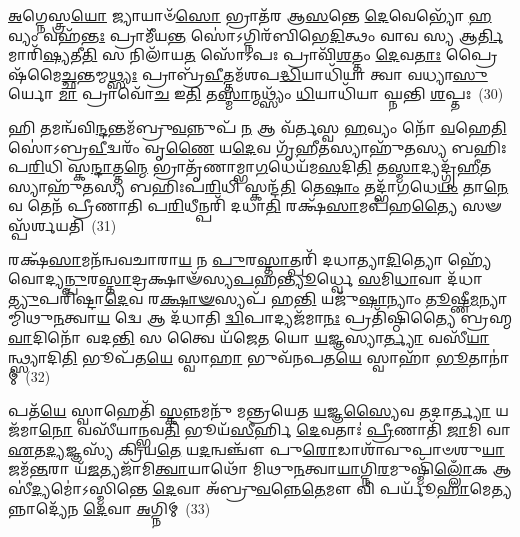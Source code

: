 {\anuvakamend[{\-\ul{𑌆}\-𑌸𑌾\-\ul{𑌦𑍍𑌯} 𑌪𑍍𑌰𑌾𑌨᳴𑌤𑌿𑌦𑍃𑌶𑍍𑌞𑌂 𑌕𑌰𑍋𑌤𑌿 𑌹𑌰𑌤𑌿 𑌵𑌿\-\ul{𑌯𑍁}\-𑌯𑌾𑌦𑍍𑌯𑌜᳴𑌮𑌾𑌨\-\ul{𑌮𑍇}\-𑌵𑌾𑌗𑍍𑌨𑌿𑌰𑌿𑌤𑌿᳴ \ul{𑌸}\-𑌪𑍍𑌤𑌦᳴𑌶 𑌚}]}%

\-\ul{𑌅}\-𑌗𑍍𑌨𑍇𑌸𑍍𑌤𑍍𑌰\-\ul{𑌯𑍋} 𑌜𑍍𑌯𑌾𑌯𑌾𑍞᳴\-\ul{𑌸𑍋} 𑌭𑍍𑌰𑌾𑌤᳴𑌰 𑌆\-\ul{𑌸}\-𑌨𑍍𑌤𑍇 \ul{𑌦𑍇}\-𑌵𑍇𑌭𑍍𑌯𑍋᳴ \ul{𑌹}\-𑌵𑍍𑌯𑌂 𑌵𑌹᳴\-\ul{𑌨𑍍𑌤𑌃} 𑌪𑍍𑌰𑌾𑌮𑍀᳴𑌯\-\ul{𑌨𑍍𑌤} 𑌸𑍋॑\-𑌽𑌗𑍍𑌨𑌿𑌰᳴𑌬𑌿𑌭𑍇\-\ul{𑌦𑌿}\-𑌤𑍍𑌥𑌂 𑌵𑌾𑌵 𑌸𑍍𑌯 𑌆\-\ul{𑌰𑍍𑌤𑌿}\-𑌮𑌾𑌰𑌿᳴\-\ul{𑌷𑍍𑌯}\-𑌤𑍀\-\ul{𑌤𑌿} 𑌸 𑌨𑌿𑌲𑌾᳴𑌯\-\ul{𑌤} 𑌸𑍋᳴\-𑌽𑌪𑌃 𑌪𑍍𑌰𑌾𑌵𑌿᳴\-\ul{𑌶}\-𑌤𑍍𑌤𑌂 \ul{𑌦𑍇}\-𑌵\-\ul{𑌤𑌾𑌃} 𑌪𑍍𑌰𑍈𑌷᳴𑌮𑍈\-\ul{𑌚𑍍𑌛}\-𑌨𑍍𑌤𑌮𑍍𑌮\-\ul{𑌥𑍍𑌸𑍍𑌯𑌃} 𑌪𑍍𑌰𑌾𑌬𑍍𑌰᳴\-\ul{𑌵𑍀}\-𑌤𑍍𑌤𑌮᳴𑌶𑌪\-\ul{𑌦𑍍𑌧𑌿}\-𑌯𑌾𑌧𑌿᳴𑌯𑌾 𑌤𑍍𑌵𑌾 𑌵𑌧𑍍𑌯𑌾\-\ul{𑌸𑍁}\-𑌰𑍍𑌯𑍋 \ul{𑌮𑌾} 𑌪𑍍𑌰𑌾𑌵𑍋᳴\-\ul{𑌚} 𑌇\-\ul{𑌤𑌿} 𑌤\-\ul{𑌸𑍍𑌮𑌾}\-𑌨𑍍𑌮𑌥𑍍𑌸𑍍𑌯𑌂᳴ \ul{𑌧𑌿}\-𑌯𑌾𑌧𑌿᳴𑌯𑌾 𑌘𑍍𑌨𑌨𑍍𑌤𑌿 \ul{𑌶}\-𑌪𑍍𑌤𑌃~(30)

𑌹𑌿 𑌤𑌮𑌨𑍍𑌵᳴𑌵𑌿\-\ul{𑌨𑍍𑌦}\-𑌨𑍍𑌤𑌮᳴𑌬𑍍𑌰𑍁\-\ul{𑌵}\-𑌨𑍍𑌨𑍁𑌪᳴ \ul{𑌨} 𑌆 𑌵᳴𑌰𑍍𑌤𑌸𑍍𑌵 \ul{𑌹}\-𑌵𑍍𑌯𑌂 𑌨𑍋᳴ \ul{𑌵}\-𑌹𑍇\-\ul{𑌤𑌿} 𑌸𑍋॑\-𑌽𑌬𑍍𑌰\-\ul{𑌵𑍀}\-𑌦𑍍𑌵𑌰𑌂᳴ 𑌵𑍃\-\ul{𑌣𑍈} 𑌯\-\ul{𑌦𑍇}\-𑌵 𑌗𑍃᳴\-\ul{𑌹𑍀}\-𑌤𑌸𑍍𑌯𑌾𑌹𑍁᳴𑌤𑌸𑍍𑌯 𑌬𑌹𑌿𑌃𑌪\-\ul{𑌰𑌿}\-𑌧𑌿 𑌸𑍍𑌕\-\ul{𑌨𑍍𑌦𑌾}\-𑌤𑍍𑌤\-\ul{𑌨𑍍𑌮𑍇} 𑌭𑍍𑌰𑌾𑌤𑍃᳴𑌣𑌾𑌮𑍍𑌭𑌾\-\ul{𑌗}\-𑌧𑍇𑌯᳴𑌮\-\ul{𑌸}\-𑌦𑌿\-\ul{𑌤𑌿} 𑌤\-\ul{𑌸𑍍𑌮𑌾}\-𑌦𑍍𑌯𑌦𑍍𑌗𑍃᳴\-\ul{𑌹𑍀}\-𑌤𑌸𑍍𑌯𑌾𑌹𑍁᳴𑌤𑌸𑍍𑌯 𑌬𑌹𑌿𑌃𑌪\-\ul{𑌰𑌿}\-𑌧𑌿 𑌸𑍍𑌕𑌨𑍍𑌦᳴\-\ul{𑌤𑌿} 𑌤𑍇\-\ul{𑌷𑌾𑌂} 𑌤𑌦𑍍𑌭𑌾᳴\-\ul{𑌗}\-𑌧𑍇\-\ul{𑌯𑌂} 𑌤𑌾\-\ul{𑌨𑍇}\-𑌵 𑌤𑍇𑌨᳴ 𑌪𑍍𑌰𑍀𑌣𑌾𑌤𑌿 𑌪\-\ul{𑌰𑌿}\-𑌧𑍀𑌨𑍍𑌪𑌰𑌿᳴ 𑌦𑌧𑌾\-\ul{𑌤𑌿} 𑌰𑌕𑍍𑌷᳴\-\ul{𑌸𑌾}\-𑌮𑌪᳴𑌹\-\ul{𑌤𑍍𑌯𑍈} 𑌸𑍟 𑌸𑍍𑌪᳴𑌰𑍍𑌶𑌯𑌤𑌿~(31)

𑌰𑌕𑍍𑌷᳴\-\ul{𑌸𑌾}\-𑌮𑌨᳴𑌨𑍍𑌵𑌵𑌚𑌾𑌰𑌾\-\ul{𑌯} 𑌨 \ul{𑌪𑍁}\-𑌰\-\ul{𑌸𑍍𑌤𑌾}\-𑌤𑍍𑌪𑌰𑌿᳴ 𑌦𑌧𑌾𑌤𑍍𑌯𑌾\-\ul{𑌦𑌿}\-𑌤𑍍𑌯𑍋 𑌹𑍍𑌯𑍇᳴𑌵𑍋𑌦𑍍𑌯\-\ul{𑌨𑍍𑌪𑍁}\-𑌰\-\ul{𑌸𑍍𑌤𑌾}\-𑌦𑍍𑌰𑌕𑍍𑌷𑌾𑍟᳴𑌸𑍍𑌯\-\ul{𑌪}\-𑌹\-\ul{𑌨𑍍𑌤𑍍𑌯𑍂}\-𑌰𑍍𑌧𑍍𑌵𑍇 \ul{𑌸}\-𑌮𑌿\-\ul{𑌧𑌾}\-𑌵𑌾 𑌦᳴𑌧𑌾\-\ul{𑌤𑍍𑌯𑍁}\-𑌪𑌰𑌿᳴𑌷𑍍𑌟𑌾\-\ul{𑌦𑍇}\-𑌵 𑌰\-\ul{𑌕𑍍𑌷𑌾}\-\-\ul{𑍟}\-𑌸𑍍𑌯𑌪᳴ 𑌹\-\ul{𑌨𑍍𑌤𑌿} 𑌯𑌜𑍁᳴\-\ul{𑌷𑌾}\-𑌨𑍍𑌯𑌾𑌂 \ul{𑌤𑍂}\-𑌷𑍍𑌣𑍀\-\ul{𑌮}\-𑌨𑍍𑌯𑌾𑌮𑍍𑌮𑌿᳴𑌥𑍁\-\ul{𑌨}\-𑌤𑍍𑌵𑌾\-\ul{𑌯} 𑌦𑍍𑌵𑍇 𑌆 𑌦᳴𑌧𑌾𑌤𑌿 \ul{𑌦𑍍𑌵𑌿}\-𑌪𑌾𑌦𑍍𑌯𑌜᳴𑌮𑌾\-\ul{𑌨𑌃} 𑌪𑍍𑌰𑌤𑌿᳴𑌷𑍍𑌠𑌿𑌤𑍍𑌯𑍈 𑌬𑍍𑌰𑌹𑍍𑌮\-\ul{𑌵𑌾}\-𑌦𑌿𑌨𑍋᳴ 𑌵𑌦\-\ul{𑌨𑍍𑌤𑌿} 𑌸 𑌤𑍍𑌵𑍈 𑌯᳴𑌜𑍇\-\ul{𑌤} 𑌯𑍋 \ul{𑌯}\-𑌜𑍍𑌞𑌸𑍍𑌯𑌾\-\ul{𑌰𑍍𑌤𑍍𑌯𑌾} 𑌵𑌸𑍀᳴\-\ul{𑌯𑌾}\-𑌨𑍍𑌥𑍍𑌸𑍍𑌯𑌾𑌦𑌿\-\ul{𑌤𑌿} 𑌭𑍂𑌪᳴𑌤\-\ul{𑌯𑍇} 𑌸𑍍𑌵𑌾\-\ul{𑌹𑌾} 𑌭𑍁𑌵᳴𑌨𑌪𑌤\-\ul{𑌯𑍇} 𑌸𑍍𑌵𑌾𑌹𑌾᳴ \ul{𑌭𑍂}\-𑌤𑌾𑌨𑌾॑𑌮𑍍~(32)

𑌪𑌤᳴\-\ul{𑌯𑍇} 𑌸𑍍𑌵𑌾𑌹𑍇𑌤𑌿᳴ \ul{𑌸𑍍𑌕}\-𑌨𑍍𑌨𑌮𑌨𑍁᳴ 𑌮𑌨𑍍𑌤𑍍𑌰𑌯𑍇𑌤 \ul{𑌯}\-𑌜𑍍𑌞\-\ul{𑌸𑍍𑌯𑍈}\-𑌵 𑌤𑌦𑌾\-\ul{𑌰𑍍𑌤𑍍𑌯𑌾} 𑌯𑌜᳴𑌮𑌾\-\ul{𑌨𑍋} 𑌵𑌸𑍀᳴𑌯𑌾𑌨𑍍𑌭𑌵\-\ul{𑌤𑌿} 𑌭𑍂𑌯᳴\-\ul{𑌸𑍀}\-𑌰𑍍\mbox{}𑌹𑌿 \ul{𑌦𑍇}\-𑌵𑌤𑌾𑌃॑ \ul{𑌪𑍍𑌰𑍀}\-𑌣𑌾𑌤𑌿᳴ \ul{𑌜𑌾}\-𑌮𑌿 𑌵𑌾 \ul{𑌏}\-𑌤\-\ul{𑌦𑍍𑌯}\-𑌜𑍍𑌞𑌸𑍍𑌯᳴ 𑌕𑍍𑌰𑌿𑌯\-\ul{𑌤𑍇} 𑌯\-\ul{𑌦}\-𑌨𑍍𑌵𑌞𑍍𑌚𑍗᳴ 𑌪𑍁\-\ul{𑌰𑍋}\-𑌡𑌾𑌶𑌾᳴𑌵𑍁𑌪𑌾𑍞𑌶𑍁\-\ul{𑌯𑌾}\-𑌜𑌮᳴\-\ul{𑌨𑍍𑌤}\-𑌰𑌾 𑌯᳴\-\ul{𑌜}\-𑌤𑍍𑌯𑌜𑌾᳴𑌮𑌿\-\ul{𑌤𑍍𑌵𑌾}\-𑌯𑌾𑌥𑍋᳴ 𑌮𑌿𑌥𑍁\-\ul{𑌨}\-𑌤𑍍𑌵𑌾\-\ul{𑌯𑌾}\-𑌗𑍍𑌨𑌿\-\ul{𑌰}\-𑌮𑍁𑌷𑍍𑌮𑌿᳴\-\ul{𑌲𑍍𑌲𑍋𑌁}\-𑌕 𑌆𑌸𑍀॑\-\ul{𑌦𑍍𑌯}\-𑌮𑍋॑\-𑌽𑌸𑍍𑌮𑌿𑌨𑍍𑌤𑍇 \ul{𑌦𑍇}\-𑌵𑌾 𑌅᳴𑌬𑍍𑌰𑍁\-\ul{𑌵}\-𑌨𑍍𑌨𑍇\-\ul{𑌤𑍇}\-𑌮𑍗 𑌵𑌿 𑌪𑌰𑍍𑌯𑍂᳴\-\ul{𑌹𑌾}\-𑌮𑍇\-\ul{𑌤𑍍𑌯}\-𑌨𑍍𑌨𑌾𑌦𑍍𑌯𑍇᳴𑌨 \ul{𑌦𑍇}\-𑌵𑌾 \ul{𑌅}\-𑌗𑍍𑌨𑌿𑌮𑍍~(33)

